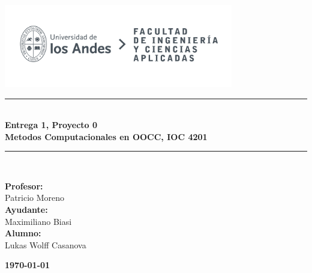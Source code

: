 \documentclass{article}
\begin{document}
\begin{titlepage}%
\newcommand{\HRule}{\rule{\linewidth}{0.5mm}} 
\center 
\includegraphics[width=10cm]{LOGO_UNIVERSIDAD.jpg}\\ %
\vspace{3cm}
\HRule \\[0.4cm]
{ \huge \bfseries Entrega 1, Proyecto 0}\\[0.4cm] %
{ \huge \bfseries Metodos Computacionales en OOCC, IOC 4201}\\[0.4cm] %
\HRule \\[1.5cm]
 \vspace{5cm}
\begin{flushright}
    { \textbf{Profesor:}\\
    Patricio Moreno\\
    \vspace{0.2cm}
    \textbf{Ayudante:} \\
    Maximiliano Biasi\\
    \vspace{0.2cm}
    \textbf{Alumno:} \\
    Lukas Wolff Casanova\\
}
\end{flushright}
\vspace{1cm}
{\large \textbf{\today}}\\[2cm] %
\end{titlepage}
\end{document}

